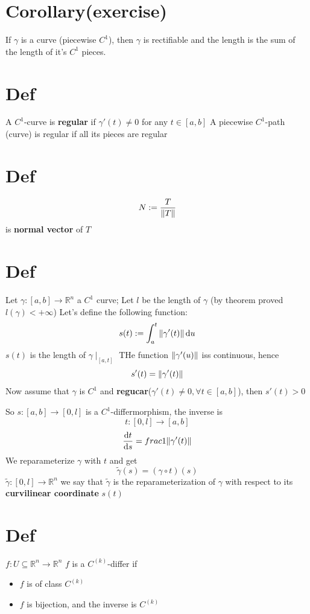 \documentclass{book}
\begin{document}
\section{Corollary(exercise)}
If $\gamma$ is a curve (piecewise $C^1$), then $\gamma$ is rectifiable and the length is the sum of the length of it's $C^1$ pieces.
\section{Def}
A $C^1$-curve is \textbf{regular} if $\gamma'(t)\neq0$ for any $t\in [a,b]$ A piecewise $C^1$-path (curve) is regular if all its pieces are regular



\section{Def}
$$N:=\frac{T}{\left\lVert T \right\rVert}$$ is \textbf{normal vector} of $T$
\section{Def}
Let $\gamma:[a,b]\rightarrow\mathbb{R}^n$ a $C^1$ curve; Let $l$ be the length of $\gamma$ (by theorem proved $l(\gamma)<+\infty$) Let's define the following function:
$$s(t):=\int_a^t\left\lVert \gamma'(t) \right\rVert\text{d}u$$
$s(t)$ is the length of $\gamma\mid_{[a,t]}$
THe function $\left\lVert \gamma'(u) \right\rVert$ iss continuous, hence
$$s'(t)=\left\lVert \gamma'(t) \right\rVert$$
Now assume that $\gamma$ is $C^1$ and \textbf{regucar}($\gamma'(t)\neq0,\forall t\in [a,b]$), then $s'(t)>0$

So $s:[a,b]\rightarrow[0,l]$ is a $C^1$-differmorphism, the inverse is $$t:[0,l]\rightarrow[a,b]$$$$\frac{\text{d}t}{\text{d}s}=frac{1}{\left\lVert \gamma'(t) \right\rVert}$$
We reparameterize $\gamma$ with $t$ and get
$$\tilde{\gamma}(s)=(\gamma\circ t)(s)$$
$\tilde{\gamma}:[0,l]\rightarrow\mathbb{R}^n$ we say that $\tilde{\gamma}$ is the reparameterization of $\gamma$ with respect to its \textbf{curvilinear coordinate} $s(t)$
\section{Def}
$f:U\subseteq\mathbb{R}^n\rightarrow\mathbb{R}^n$ $f$ is a $C^{(k)}$-differ if \begin{itemize}
    \item $f$ is of class $C^{(k)}$
    \item $f$ is bijection, and the inverse is $C^{(k)}$
\end{itemize}
\end{document}
